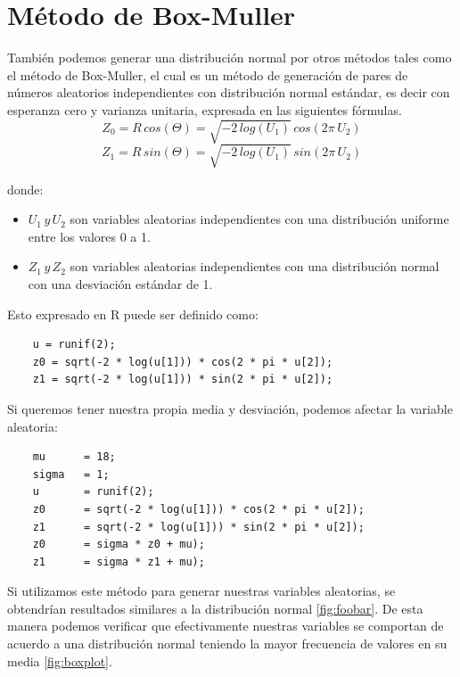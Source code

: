 \documentclass[]{article}
\begin{document}
\section{Método de Box-Muller}
También podemos generar una distribución normal por otros métodos tales como el método de Box-Muller, el cual es un método de generación de pares de números aleatorios independientes con distribución normal estándar, es decir con esperanza cero y varianza unitaria, expresada en las siguientes fórmulas.
\[Z_{0} = R\, cos(\Theta ) = \sqrt{-2\, log(U_{1})}\,  cos(2\pi\,  U_{2})\]
\[Z_{1} = R\, sin(\Theta ) = \sqrt{-2\, log(U_{1})}\,  sin(2\pi\,  U_{2})\]

donde:
\begin{itemize}
	\item $U_{1}\, y\, U_{2}$  son variables aleatorias independientes con una distribución uniforme entre los valores 0 a 1.
	\item $Z_{1}\, y\, Z_{2}$ son variables aleatorias independientes con una distribución normal con una desviación estándar
de 1.
\end{itemize}

Esto expresado en R puede ser definido como:
  \begin{lstlisting}
    u = runif(2);
    z0 = sqrt(-2 * log(u[1])) * cos(2 * pi * u[2]);
    z1 = sqrt(-2 * log(u[1])) * sin(2 * pi * u[2]);
   \end{lstlisting}
Si queremos tener nuestra propia media y desviación, podemos afectar la variable aleatoria:
  \begin{lstlisting}
    mu      = 18;
    sigma   = 1;
    u       = runif(2);
    z0      = sqrt(-2 * log(u[1])) * cos(2 * pi * u[2]);
    z1      = sqrt(-2 * log(u[1])) * sin(2 * pi * u[2]);
    z0      = sigma * z0 + mu);
    z1      = sigma * z1 + mu);
   \end{lstlisting}
Si utilizamos este método para generar nuestras variables aleatorias, se obtendrían resultados similares a la distribución normal \autoref{fig:foobar}. 
De esta manera podemos verificar que efectivamente nuestras variables se comportan de acuerdo a una distribución normal teniendo la mayor frecuencia de valores en su media \autoref{fig:boxplot}. 
\end{document}
